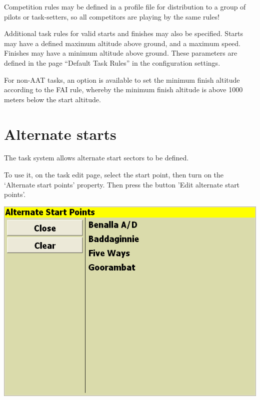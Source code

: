 \documentclass[a4paper,12pt]{refrep}
\begin{document}
\tip Competition rules may be defined in a profile file for
distribution to a group of pilots or task-setters, so all competitors
are playing by the same rules!

Additional task rules for valid starts and finishes may also be
specified.  Starts may have a defined maximum altitude above ground,
and a maximum speed.  Finishes may have a minimum altitude above
ground.  These parameters are defined in the page ``Default Task Rules'' in
the configuration  settings.

For non-AAT tasks, an option is available to set the minimum finish
altitude according to the FAI rule, whereby the minimum finish
altitude is above 1000 meters below the start altitude.

\section{Alternate starts}\label{sec:alternate-starts}


The task system allows alternate start sectors to be defined.
  
To use it, on the task edit page, select the start point, then turn on
the `Alternate start points' property.  Then press the button 'Edit
alternate start points'.

\begin{center}
\includegraphics[angle=0,width=\linewidth,keepaspectratio='true']{figures/dialog-startpoint2.png}
\end{center}
  
\end{document}
